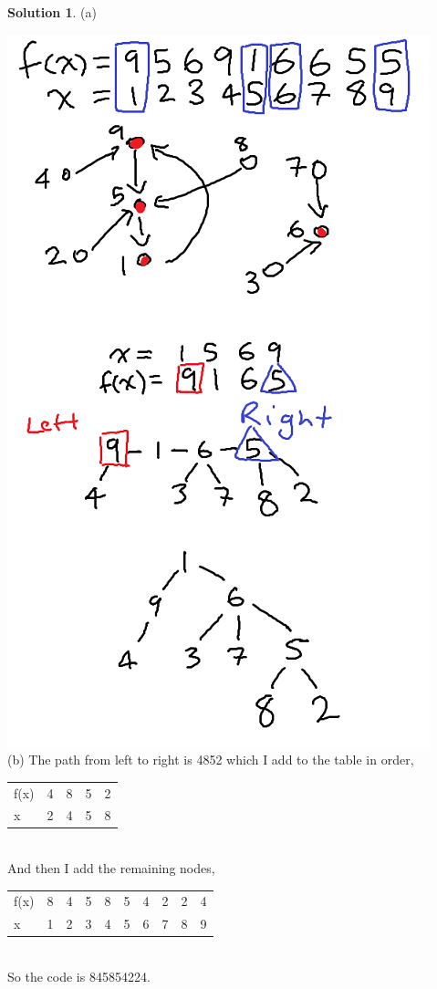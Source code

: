 \documentclass{article}
\theoremstyle{definition}
\newtheorem*{solution}{Solution}
\begin{document}
\begin{solution}

(a) 

\includegraphics[scale=1]{a6q3a} \\

(b) The path from left to right is 4852 which I add to the table in order, \\

\begin{tabular}{lllll}
f(x) & 4 & 8 & 5 & 2 \\
x    & 2 & 4 & 5 & 8
\end{tabular}\\

And then I add the remaining nodes, \\

\begin{tabular}{llllllllll}
f(x) & 8 & 4 & 5 & 8 & 5 & 4 & 2 & 2 & 4 \\
x    & 1 & 2 & 3 & 4 & 5 & 6 & 7 & 8 & 9
\end{tabular} \\

So the code is 845854224.

\end{solution}
\end{document}
